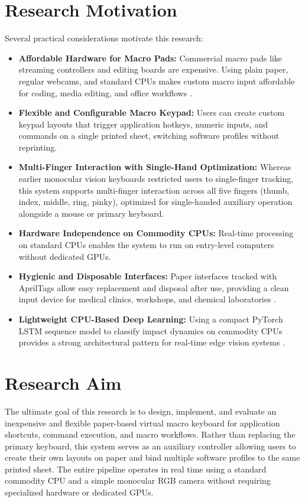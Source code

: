 \section{Research Motivation}
\label{sec:research_motivation}
Several practical considerations motivate this research:
\begin{itemize}
    \item \textbf{Affordable Hardware for Macro Pads:} Commercial macro pads like streaming controllers and editing boards are expensive. Using plain paper, regular webcams, and standard CPUs makes custom macro input affordable for coding, media editing, and office workflows \cite{Khare2019QWERTY, Sreenath2021Monocular}.
    \item \textbf{Flexible and Configurable Macro Keypad:} Users can create custom keypad layouts that trigger application hotkeys, numeric inputs, and commands on a single printed sheet, switching software profiles without reprinting.
    \item \textbf{Multi-Finger Interaction with Single-Hand Optimization:} Whereas earlier monocular vision keyboards restricted users to single-finger tracking, this system supports multi-finger interaction across all five fingers (thumb, index, middle, ring, pinky), optimized for single-handed auxiliary operation alongside a mouse or primary keyboard.
    \item \textbf{Hardware Independence on Commodity CPUs:} Real-time processing on standard CPUs enables the system to run on entry-level computers without dedicated GPUs.
    \item \textbf{Hygienic and Disposable Interfaces:} Paper interfaces tracked with AprilTags allow easy replacement and disposal after use, providing a clean input device for medical clinics, workshops, and chemical laboratories \cite{ReviewVirtualKeyboard2020}.
    \item \textbf{Lightweight CPU-Based Deep Learning:} Using a compact PyTorch LSTM sequence model to classify impact dynamics on commodity CPUs provides a strong architectural pattern for real-time edge vision systems \cite{Hochreiter1997LSTM, Zhang2020MediaPipe, GilMartin2023Hand}.
\end{itemize}

\section{Research Aim}
\label{sec:research_aim}
The ultimate goal of this research is to design, implement, and evaluate an inexpensive and flexible paper-based virtual macro keyboard for application shortcuts, command execution, and macro workflows. Rather than replacing the primary keyboard, this system serves as an auxiliary controller allowing users to create their own layouts on paper and bind multiple software profiles to the same printed sheet. The entire pipeline operates in real time using a standard commodity CPU and a simple monocular RGB camera without requiring specialized hardware or dedicated GPUs.

